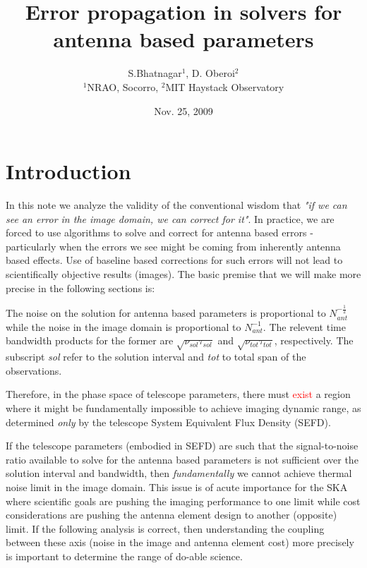 \documentclass[11pt]{article}
\begin{document}
\title{Error propagation in solvers for antenna based parameters}
\author{S.Bhatnagar$^{1}$, D. Oberoi$^{2}$\\ $^{1}$NRAO, Socorro, $^{2}$MIT Haystack Observatory}
\date{Nov. 25, 2009}
\maketitle
\normalsize



\section{Introduction}

In this note we analyze the validity of the conventional wisdom that
{\it "if we can see an error in the image domain, we can correct for
  it"}.  In practice, we are forced to use algorithms to solve and
correct for antenna based errors - particularly when the errors we see
might be coming from inherently antenna based effects. Use of baseline
based corrections for such errors will not lead to scientifically
objective results (images).  %
The basic premise that we will make more precise in the following
sections is:
\begin{description}
\item The noise on the solution for antenna based parameters is
  proportional to ${N^{-\frac{1}{2}}_{ant}}$ while the noise in the
  image domain is proportional to $N^{-1}_{ant}$.
  The relevent time bandwidth products for the former are $\sqrt{\nu_{sol} \tau_{sol}}$ and $\sqrt{\nu_{tot} \tau_{tot}}$, respectively.
  The subscript {\em sol} refer to the solution interval and {\em tot} to total span of the observations.
\item Therefore, in the phase space of telescope parameters, there must \textcolor{red}{exist} a
  region where it might be fundamentally impossible to achieve imaging
  dynamic range, as determined {\it only} by the telescope System
  Equivalent Flux Density (SEFD).
\item 
\end{description}

If the telescope parameters (embodied in SEFD) are such that the
signal-to-noise ratio available to solve for the antenna based
parameters is not sufficient over the solution interval and bandwidth,
then {\it fundamentally} we cannot achieve thermal noise limit in the
image domain.  %
This issue is of acute importance for the SKA where scientific goals
are pushing the imaging performance to one limit while cost
considerations are pushing the antenna element design to another
(opposite) limit.  If the following analysis is correct, then
understanding the coupling between these axis (noise in the image and
antenna element cost) more precisely is important to determine the
range of do-able science.
\end{document}
